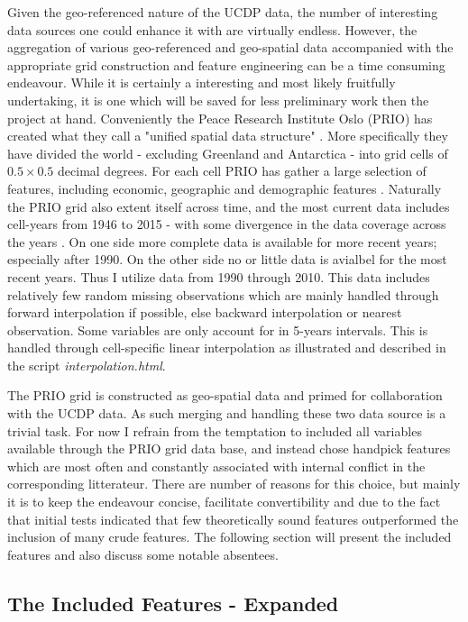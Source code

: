 \documentclass[a4paper]{article}
\begin{document}
Given the geo-referenced nature of the UCDP data, the number of interesting data sources one could enhance it with are virtually endless. However, the aggregation of various geo-referenced and geo-spatial data accompanied with the appropriate grid construction and feature engineering can be a time consuming endeavour. While it is certainly a interesting and most likely fruitfully undertaking, it is one which will be saved for less preliminary work then the project at hand. Conveniently the Peace Research Institute Oslo (PRIO) has created what they call a "unified spatial data structure" \cite[1]{Tollefsen_2012}. More specifically they have divided the world - excluding Greenland and Antarctica - into grid cells of $0.5 \times 0.5$ decimal degrees. For each cell PRIO has gather a large selection of features, including economic, geographic and demographic features \citep{Tollefsen_2012}. Naturally the PRIO grid also extent itself across time, and the most current data includes cell-years from 1946 to 2015 - with some divergence in the data coverage across the years \citep{Tollefsen_2016}. On one side more complete data is available for more recent years; especially after 1990. On the other side no or little data is avialbel for the most recent years. Thus I utilize data from 1990 through 2010. This data includes relatively few random missing observations which are mainly handled through forward interpolation if possible, else backward interpolation or nearest observation. Some variables are only account for in 5-years intervals. This is handled through cell-specific linear interpolation as illustrated and described in the script \emph{interpolation.html}.

The PRIO grid is constructed as geo-spatial data and primed for collaboration with the UCDP data. As such merging and handling these two data source is a trivial task. For now I refrain from the temptation to included all variables available through the PRIO grid data base, and instead chose handpick features which are most often and constantly associated with internal conflict in the corresponding litterateur. There are number of reasons for this choice, but mainly it is to keep the endeavour concise, facilitate convertibility and due to the fact that initial tests indicated that few theoretically sound features outperformed the inclusion of many crude features. The following section will present the included features and also discuss some notable absentees.\par

\subsection{The Included Features - Expanded}\label{feature_expanded}
\end{document}

